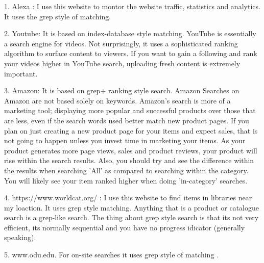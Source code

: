 \documentclass[letterpaper,11pt]{article}
\begin{document}
1. Alexa : I use this website to montor the website traffic, statistics and analytics. It uses the grep style of matching.

2. Youtube: It is based on index-database style matching. YouTube is essentially a search engine for videos. Not surprisingly, it uses a sophisticated ranking algorithm to surface content to viewers. If you want to gain a following and rank your videos higher in YouTube search, uploading fresh content is extremely important.

3. Amazon: It is based on grep+ ranking style search. Amazon Searches on Amazon are not based solely on keywords. Amazon's search is more of a marketing tool; displaying more popular and successful products over those that are less, even if the search words used better match new product pages. If you plan on just creating a new product page for your items and expect sales, that is not going to happen unless you invest time in marketing your items. As your product generates more page views, sales and product reviews, your product will rise within the search results. Also, you should try and see the difference within the results when searching 'All' as compared to searching within the category. You will likely see your item ranked higher when doing 'in-category' searches.

4. https://www.worldcat.org/ : I use this website to find items in libraries near my loaction. It uses grep style matching. Anything that is a product or catalogue search is a grep-like search.  The thing about grep style search is that its not very efficient, its normally sequential and you have no progress idicator (generally speaking).

5. www.odu.edu. For on-site searches it uses grep style of matching .


\clearpage
\end{document}
